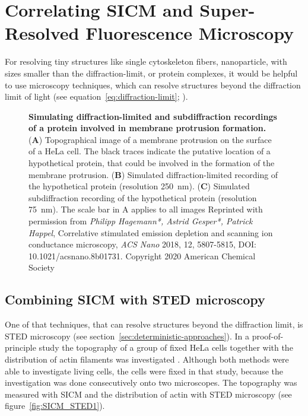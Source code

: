 \section{Correlating SICM and Super-Resolved Fluorescence Microscopy}
\label{sec:correlating-sicm-and-srfm}

For resolving tiny structures like single cytoskeleton fibers, nanoparticle, with sizes smaller
than the diffraction-limit, or protein complexes, it would be helpful to use microscopy
techniques, which can resolve structures beyond the diffraction limit of light (see 
equation~\ref{eq:diffraction-limit}; \cite{Abbe1873}).


\begin{figure}
  \centering
    \caption{
    \textbf{Simulating diffraction-limited and subdiffraction recordings of a protein involved in 
    membrane protrusion formation.} 
    (\textbf{A}) Topographical image of a membrane protrusion on the surface of a HeLa cell. The 
    black traces indicate the putative location of a hypothetical protein, that could be involved 
    in the formation of the membrane protrusion. (\textbf{B}) Simulated diffraction-limited 
    recording of the hypothetical protein (resolution 250~nm). (\textbf{C}) Simulated 
    subdiffraction recording of the hypothetical protein (resolution 75~nm). The scale bar in A 
    applies to all images \newline Reprinted with permission from \emph{Philipp Hagemann*, Astrid 
    Gesper*, Patrick Happel}, Correlative stimulated emission depletion and scanning ion 
    conductance microscopy, \emph{ACS Nano} 2018, 12, 5807-5815, DOI: 10.1021/acsnano.8b01731. 
    Copyright 2020 American Chemical Society}
  \label{fig:structure_element_FM_vs_SRFM}
\end{figure}    

\subsection{Combining SICM with STED microscopy}

One of that techniques, that can resolve structures beyond the diffraction limit, is STED 
microscopy (see section~\ref{sec:deterministic-approaches}). In a proof-of-principle study the 
topography of a group of fixed HeLa cells together with the distribution of actin filaments was
investigated \cite{Hagemann2018}. Although both methods were able to investigate living cells, the 
cells were fixed in that study, because the investigation was done consecutively onto two 
microscopes. The topography was measured with SICM and the distribution of actin with STED 
microscopy (see figure~\ref{fig:SICM_STED1}).


